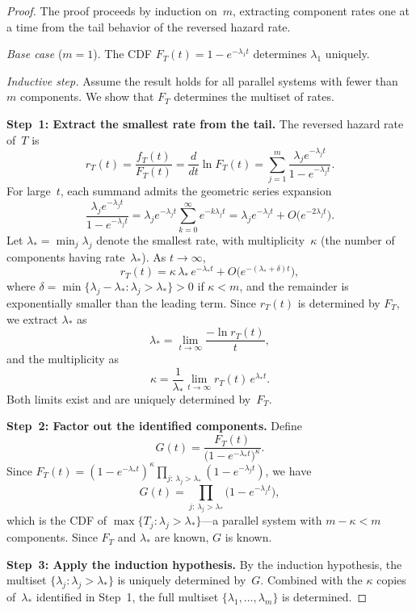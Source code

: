 \begin{proof}
The proof proceeds by induction on~$m$, extracting component rates one
at a time from the tail behavior of the reversed hazard rate.

\emph{Base case} ($m = 1$).
The CDF $F_T(t) = 1 - e^{-\lambda_1 t}$ determines $\lambda_1$
uniquely.

\emph{Inductive step.}  Assume the result holds for all parallel systems
with fewer than~$m$ components.  We show that $F_T$ determines the
multiset of rates.

\textbf{Step~1: Extract the smallest rate from the tail.}
The reversed hazard rate of~$T$
\citep[the natural hazard analogue for parallel systems;
see][]{BlockSavitsSingh1998} is
\[
  r_T(t) = \frac{f_T(t)}{F_T(t)}
  = \frac{d}{dt} \ln F_T(t)
  = \sum_{j=1}^m \frac{\lambda_j e^{-\lambda_j t}}{1 - e^{-\lambda_j t}}.
\]
For large~$t$, each summand admits the geometric series expansion
\[
  \frac{\lambda_j e^{-\lambda_j t}}{1 - e^{-\lambda_j t}}
  = \lambda_j e^{-\lambda_j t} \sum_{k=0}^\infty e^{-k\lambda_j t}
  = \lambda_j e^{-\lambda_j t} + O\bigl(e^{-2\lambda_j t}\bigr).
\]
Let $\lambda_* = \min_j \lambda_j$ denote the smallest rate, with
multiplicity~$\kappa$ (the number of components having rate~$\lambda_*$).
As $t \to \infty$,
\begin{equation}\label{eq:rhr-asymp}
  r_T(t) = \kappa\, \lambda_*\, e^{-\lambda_* t}
  + O\bigl(e^{-(\lambda_* + \delta) t}\bigr),
\end{equation}
where $\delta = \min\{\lambda_j - \lambda_* : \lambda_j > \lambda_*\} > 0$
if $\kappa < m$, and the remainder is exponentially smaller than the
leading term.  Since $r_T(t)$ is determined by $F_T$, we extract
$\lambda_*$ as
\[
  \lambda_* = \lim_{t \to \infty} \frac{-\ln r_T(t)}{t},
\]
and the multiplicity as
\[
  \kappa = \frac{1}{\lambda_*} \lim_{t \to \infty} r_T(t)\, e^{\lambda_* t}.
\]
Both limits exist and are uniquely determined by~$F_T$.

\textbf{Step~2: Factor out the identified components.}
Define
\[
  G(t) = \frac{F_T(t)}{\bigl(1 - e^{-\lambda_* t}\bigr)^\kappa}.
\]
Since $F_T(t) = (1 - e^{-\lambda_* t})^\kappa \prod_{j:\, \lambda_j > \lambda_*}
(1 - e^{-\lambda_j t})$, we have
\[
  G(t) = \prod_{j:\, \lambda_j > \lambda_*} \bigl(1 - e^{-\lambda_j t}\bigr),
\]
which is the CDF of $\max\{T_j : \lambda_j > \lambda_*\}$---a parallel system
with $m - \kappa < m$ components.  Since $F_T$ and $\lambda_*$ are known, $G$
is known.

\textbf{Step~3: Apply the induction hypothesis.}
By the induction hypothesis, the multiset $\{\lambda_j : \lambda_j > \lambda_*\}$
is uniquely determined by~$G$.  Combined with the $\kappa$ copies of~$\lambda_*$
identified in Step~1, the full multiset $\{\lambda_1, \ldots, \lambda_m\}$ is
determined.
\end{proof}

